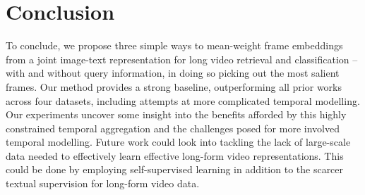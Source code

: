 \section{Conclusion}
\vspace{-0.8em}
To conclude, we propose three simple ways to mean-weight frame embeddings from a joint image-text representation for long video retrieval and classification -- with and without query information, in doing so picking out the most salient frames. Our method provides a strong baseline, outperforming all prior works across four datasets, including attempts at more complicated temporal modelling. Our experiments uncover some insight into the benefits afforded by this highly constrained temporal aggregation and the challenges posed for more involved temporal modelling. Future work could look into tackling the lack of large-scale data needed to effectively learn effective long-form video representations. This could be done by employing self-supervised learning in addition to the scarcer textual supervision for long-form video data.
